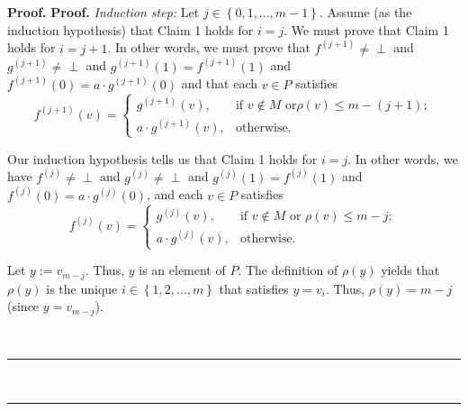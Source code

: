 \documentclass[numbers=enddot,12pt,final,onecolumn,notitlepage]{scrartcl}%
\theoremstyle{definition}
\newenvironment{verlong}{}{}
\newcommand{\undf}{\operatorname*{\bot}}
\newenvironment{proof}[1][Proof]{\noindent\textbf{#1.} }{\ \rule{0.5em}{0.5em}}
\begin{document}
\begin{verlong}
\begin{proof}
\begin{proof}
\textit{Induction step:} Let $j\in\left\{  0,1,\ldots,m-1\right\}  $. Assume
(as the induction hypothesis) that Claim 1 holds for $i=j$. We must prove that
Claim 1 holds for $i=j+1$. In other words, we must prove that $f^{\left(
j+1\right)  }\neq\undf$ and $g^{\left(  j+1\right)  }\neq\undf$ and
$g^{\left(  j+1\right)  }\left(  1\right)  =f^{\left(  j+1\right)  }\left(
1\right)  $ and $f^{\left(  j+1\right)  }\left(  0\right)  =a\cdot g^{\left(
j+1\right)  }\left(  0\right)  $ and that each $v\in P$ satisfies%
\begin{equation}
f^{\left(  j+1\right)  }\left(  v\right)  =%
\begin{cases}
g^{\left(  j+1\right)  }\left(  v\right)  , & \text{if }v\notin M\text{ or
}\rho\left(  v\right)  \leq m-\left(  j+1\right)  ;\\
a\cdot g^{\left(  j+1\right)  }\left(  v\right)  , & \text{otherwise.}%
\end{cases}
\label{pf.lem.ato1.c1.IG}%
\end{equation}


Our induction hypothesis tells us that Claim 1 holds for $i=j$. In other
words, we have $f^{\left(  j\right)  }\neq\undf$ and $g^{\left(  j\right)
}\neq\undf$ and $g^{\left(  j\right)  }\left(  1\right)  =f^{\left(  j\right)
}\left(  1\right)  $ and $f^{\left(  j\right)  }\left(  0\right)  =a\cdot
g^{\left(  j\right)  }\left(  0\right)  $, and each $v\in P$ satisfies%
\begin{equation}
f^{\left(  j\right)  }\left(  v\right)  =%
\begin{cases}
g^{\left(  j\right)  }\left(  v\right)  , & \text{if }v\notin M\text{ or }%
\rho\left(  v\right)  \leq m-j;\\
a\cdot g^{\left(  j\right)  }\left(  v\right)  , & \text{otherwise.}%
\end{cases}
\label{pf.lem.ato1.c1.IH}%
\end{equation}


Let $y:=v_{m-j}$. Thus, $y$ is an element of $P$. The definition of
$\rho\left(  y\right)  $ yields that $\rho\left(  y\right)  $ is the unique
$i\in\left\{  1,2,\ldots,m\right\}  $ that satisfies $y=v_{i}$. Thus,
$\rho\left(  y\right)  =m-j$ (since $y=v_{m-j}$).


\end{proof}
\end{proof}
\end{verlong}
\end{document}
